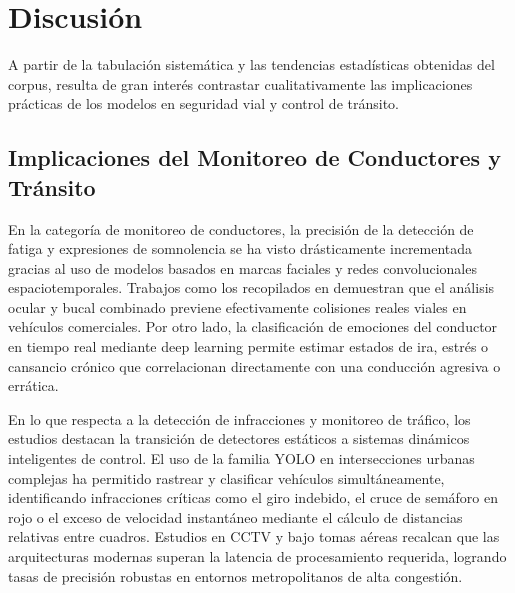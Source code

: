 \section{Discusión}
A partir de la tabulación sistemática y las tendencias estadísticas obtenidas del corpus, resulta de gran interés contrastar cualitativamente las implicaciones prácticas de los modelos en seguridad vial y control de tránsito.

\subsection{Implicaciones del Monitoreo de Conductores y Tránsito}
En la categoría de monitoreo de conductores, la precisión de la detección de fatiga y expresiones de somnolencia se ha visto drásticamente incrementada gracias al uso de modelos basados en marcas faciales y redes convolucionales espaciotemporales. Trabajos como los recopilados en \cite{kim2025unsupervised, essahraui2025realtime} demuestran que el análisis ocular y bucal combinado previene efectivamente colisiones reales viales en vehículos comerciales. Por otro lado, la clasificación de emociones del conductor en tiempo real mediante deep learning \cite{lin2025dangerous, le2025redlight} permite estimar estados de ira, estrés o cansancio crónico que correlacionan directamente con una conducción agresiva o errática.

En lo que respecta a la detección de infracciones y monitoreo de tráfico, los estudios destacan la transición de detectores estáticos a sistemas dinámicos inteligentes de control. El uso de la familia YOLO en intersecciones urbanas complejas ha permitido rastrear y clasificar vehículos simultáneamente, identificando infracciones críticas como el giro indebido, el cruce de semáforo en rojo o el exceso de velocidad instantáneo mediante el cálculo de distancias relativas entre cuadros. Estudios en CCTV \cite{pavan2026aipowered, le2025redlight} y bajo tomas aéreas \cite{abukhadrah2025droneassisted, chouhan2025deep} recalcan que las arquitecturas modernas superan la latencia de procesamiento requerida, logrando tasas de precisión robustas en entornos metropolitanos de alta congestión.

